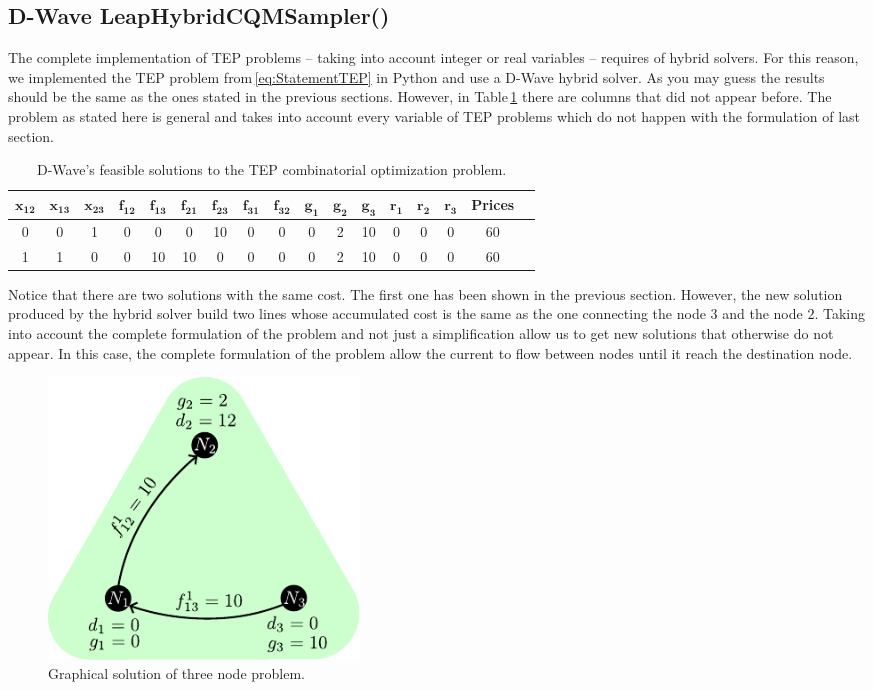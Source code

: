 \subsection{D-Wave LeapHybridCQMSampler()}
The complete implementation of TEP problems -- taking into account integer or real variables -- requires of hybrid solvers. For this reason, we implemented the TEP problem from\,\eqref{eq:StatementTEP} in Python and use a D-Wave hybrid solver. As you may guess the results should be the same as the ones stated in the previous sections. However, in Table\,\ref{tab:SmallNetworkResultsHybrid} there are columns that did not appear before. The problem as stated here is general and takes into account every variable of TEP problems which do not happen with the formulation of last section.
 \begin{table}[H]
\centering
\begin{tabular}{ |c|c|c|c|c|c|c|c|c|c|c|c|c|c|c|c|c| }
  \hline			
  $\mathbf{x_{12}}$ & $\mathbf{x_{13}}$ & $\mathbf{x_{23}}$ & $\mathbf{f_{12}}$ & $\mathbf{f_{13}}$ & $\mathbf{f_{21}}$ & $\mathbf{f_{23}}$ & $\mathbf{f_{31}}$ & $\mathbf{f_{32}}$ &$\mathbf{g_{1}}$ & $\mathbf{g_{2}}$ & $\mathbf{g_{3}}$ & $\mathbf{r_{1}}$ & $\mathbf{r_{2}}$ & $\mathbf{r_{3}}$ &  \textbf{Prices} \\
  \hline
    0 & 0 & 1 & 0 & 0 & 0 & 10 & 0 & 0 & 0 & 2 & 10 & 0 & 0 & 0 & 60 \\
  \hline
  1 & 1 & 0 & 0 & 10 & 10 & 0 & 0 & 0 & 0 & 2 & 10 & 0 & 0 & 0 & 60 \\
  \hline
\end{tabular}
\caption{D-Wave's feasible solutions to the TEP combinatorial optimization problem.}
\label{tab:SmallNetworkResultsHybrid}
\end{table}
Notice that there are two solutions with the same cost. The first one has been shown in the previous section. However, the new solution produced by the hybrid solver build two lines whose accumulated cost is the same as the one connecting the node $3$ and the node $2$. Taking into account the complete formulation of the problem and not just a simplification allow us to get new solutions that otherwise do not appear. In this case, the complete formulation of the problem allow the current to flow between nodes until it reach the destination node.
\begin{figure}[H]
  \begin{center}
\includegraphics[width=0.4\textwidth]{Figures/3NodeGreenHybrid.pdf}
  \end{center}
  \caption{Graphical solution of three node problem.}
  \label{fig: Green_final_Hybrid}
\end{figure}
